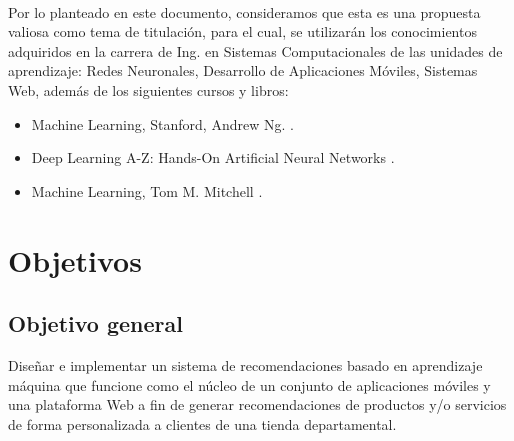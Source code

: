 \\ \par
Por lo planteado en este documento, consideramos que esta es una propuesta valiosa como tema de titulación, para el cual, se utilizarán los conocimientos adquiridos en la carrera de Ing. en Sistemas Computacionales de las unidades de aprendizaje: Redes Neuronales, Desarrollo de Aplicaciones Móviles, Sistemas Web, además de los siguientes cursos y libros: \\

\begin{itemize}
\item Machine Learning, Stanford, Andrew Ng.  \cite{Andrew}.
\item Deep Learning A-Z: Hands-On Artificial Neural Networks \cite{eremenko}.
\item Machine Learning, Tom M. Mitchell  \cite{mitchell}.
\end{itemize}


\section{Objetivos}

\subsection{Objetivo general}
Diseñar e implementar un sistema de recomendaciones basado en aprendizaje máquina que funcione como el núcleo de un conjunto de aplicaciones móviles y una plataforma Web a fin de generar recomendaciones de productos y/o servicios de forma personalizada a clientes de una tienda departamental.
\\ \par
